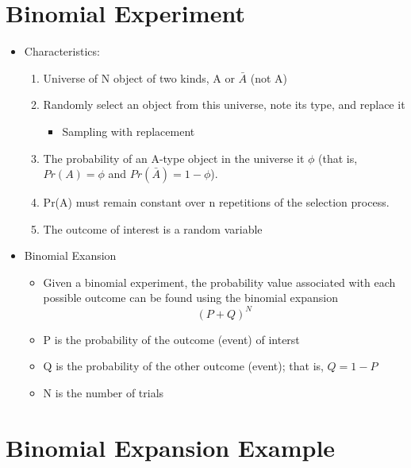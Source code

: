 \documentclass[12pt]{article}
\begin{document}
\section{Binomial Experiment}\label{binomial-experiment}

\begin{itemize}
\itemsep1pt\parskip0pt
\item
  Characteristics:

  \begin{enumerate}
  \def\labelenumi{\arabic{enumi}.}
  \itemsep1pt\parskip0pt
  \item
    Universe of N object of two kinds, A or \(\bar{A}\) (not A)
  \item
    Randomly select an object from this universe, note its type, and
    replace it

    \begin{itemize}
    \itemsep1pt\parskip0pt
    \item
      Sampling with replacement
    \end{itemize}
  \item
    The probability of an A-type object in the universe it \(\phi\)
    (that is, \(Pr(A) = \phi\) and \(Pr(\bar{A}) = 1 - \phi\)).
  \item
    Pr(A) must remain constant over n repetitions of the selection
    process.
  \item
    The outcome of interest is a random variable
  \end{enumerate}
\item
  Binomial Exansion

  \begin{itemize}
  \itemsep1pt\parskip0pt
  \item
    Given a binomial experiment, the probability value associated with
    each possible outcome can be found using the binomial expansion
    \[ (P + Q)^N\]
  \item
    P is the probability of the outcome (event) of interst
  \item
    Q is the probability of the other outcome (event); that is,
    \(Q = 1 - P\)
  \item
    N is the number of trials
  \end{itemize}
\end{itemize}

\section{Binomial Expansion Example}\label{binomial-expansion-example}
\end{document}

